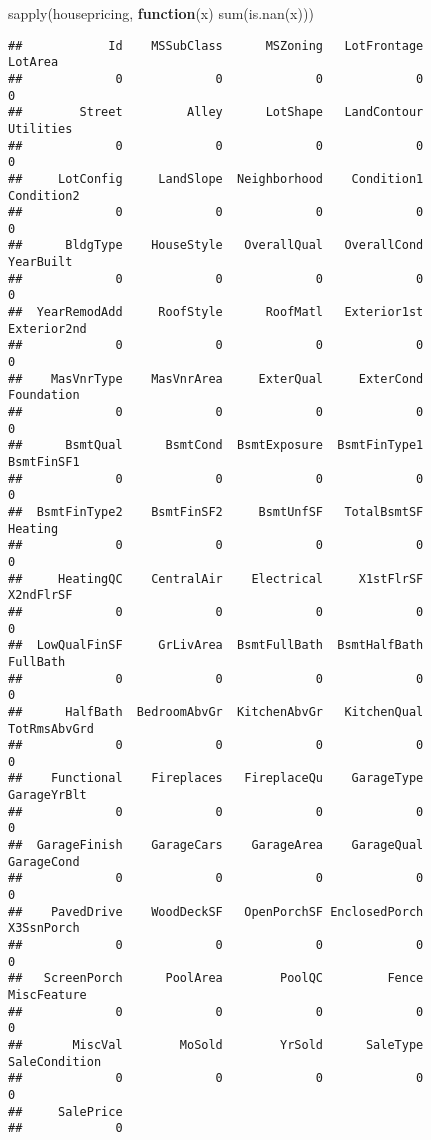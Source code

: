 \documentclass[
]{article}
\newenvironment{Shaded}{\begin{snugshade}}{\end{snugshade}}
\newcommand{\ControlFlowTok}[1]{\textcolor[rgb]{0.13,0.29,0.53}{\textbf{#1}}}
\newcommand{\FunctionTok}[1]{\textcolor[rgb]{0.00,0.00,0.00}{#1}}
\newcommand{\NormalTok}[1]{#1}
\begin{document}
\begin{Shaded}
\begin{Highlighting}[]
\FunctionTok{sapply}\NormalTok{(housepricing, }\ControlFlowTok{function}\NormalTok{(x) }\FunctionTok{sum}\NormalTok{(}\FunctionTok{is.nan}\NormalTok{(x)))}
\end{Highlighting}
\end{Shaded}

\begin{verbatim}
##            Id    MSSubClass      MSZoning   LotFrontage       LotArea 
##             0             0             0             0             0 
##        Street         Alley      LotShape   LandContour     Utilities 
##             0             0             0             0             0 
##     LotConfig     LandSlope  Neighborhood    Condition1    Condition2 
##             0             0             0             0             0 
##      BldgType    HouseStyle   OverallQual   OverallCond     YearBuilt 
##             0             0             0             0             0 
##  YearRemodAdd     RoofStyle      RoofMatl   Exterior1st   Exterior2nd 
##             0             0             0             0             0 
##    MasVnrType    MasVnrArea     ExterQual     ExterCond    Foundation 
##             0             0             0             0             0 
##      BsmtQual      BsmtCond  BsmtExposure  BsmtFinType1    BsmtFinSF1 
##             0             0             0             0             0 
##  BsmtFinType2    BsmtFinSF2     BsmtUnfSF   TotalBsmtSF       Heating 
##             0             0             0             0             0 
##     HeatingQC    CentralAir    Electrical     X1stFlrSF     X2ndFlrSF 
##             0             0             0             0             0 
##  LowQualFinSF     GrLivArea  BsmtFullBath  BsmtHalfBath      FullBath 
##             0             0             0             0             0 
##      HalfBath  BedroomAbvGr  KitchenAbvGr   KitchenQual  TotRmsAbvGrd 
##             0             0             0             0             0 
##    Functional    Fireplaces   FireplaceQu    GarageType   GarageYrBlt 
##             0             0             0             0             0 
##  GarageFinish    GarageCars    GarageArea    GarageQual    GarageCond 
##             0             0             0             0             0 
##    PavedDrive    WoodDeckSF   OpenPorchSF EnclosedPorch    X3SsnPorch 
##             0             0             0             0             0 
##   ScreenPorch      PoolArea        PoolQC         Fence   MiscFeature 
##             0             0             0             0             0 
##       MiscVal        MoSold        YrSold      SaleType SaleCondition 
##             0             0             0             0             0 
##     SalePrice 
##             0
\end{verbatim}
\end{document}
